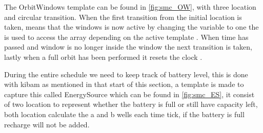The OrbitWindows template can be found in \cref{fig:smc_OW}, with three location and circular transition. When the first transition from the initial location is taken, means that the windows is now active by changing the variable  to one the  is used to access the array depending on the active template . When time has passed and window is no longer inside the window the next transition is taken, lastly when a full orbit has been performed it resets the clock .

During the entire schedule we need to keep track of battery level, this is done with \gls{kibam} as mentioned in that start of this section, a template is made to capture this called EnergySource which can be found in \cref{fig:smc_ES}, it consist of two location to represent whether the battery is full or still have capacity left, both location calculate the a and b wells each time tick, if the battery is full recharge will not be added.






